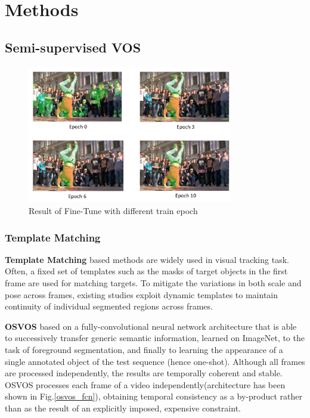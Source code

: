 \section{Methods}

\subsection{Semi-supervised VOS}
\begin{figure}[ht]
    \centering
    \includegraphics[width=0.8\textwidth]{./figure/fine_tune_result.png}
    \caption{Result of Fine-Tune with different train epoch}
    \label{fine_tune_result}
\end{figure}


\subsubsection{Template Matching}

\textbf{Template Matching} based methods are widely used in visual tracking task\cite{OSVOS}\cite{OSVOS-S}\cite{BVS}\cite{PML}. Often, a fixed set of templates such as the masks of target objects in the first frame are used for matching targets. To mitigate the variations in both scale and pose across frames, existing studies \cite{PML} exploit dynamic templates to maintain continuity of individual segmented regions across frames.

\textbf{OSVOS}\cite{OSVOS} based on a fully-convolutional neural network architecture that is able to successively transfer generic semantic information, learned on ImageNet\cite{Krizhevsky2012ImageNet}, to the task of foreground segmentation, and finally to learning the appearance of a single annotated object of the test sequence (hence one-shot). Although all frames are processed independently, the results are temporally coherent and stable. OSVOS processes each frame of a video independently(architecture has been shown in Fig.\ref{osvos_fcn}), obtaining temporal consistency as a by-product rather than as the result of an explicitly imposed, expensive constraint. 

